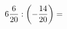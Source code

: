 \documentclass[preview]{standalone}
\begin{document}
\begin{align*}
6 { 6 \over 20 }  :  \left( - { 14 \over 20 } \right)  =
\end{align*}
\end{document}
